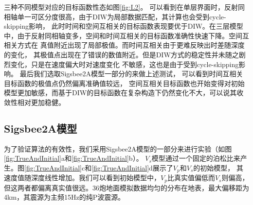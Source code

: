 三种不同模型对应的目标函数性态如图\ref{fig:L2}。
可以看到在单层界面时，反射同相轴单一可区分度很高，由于DIW为局部数据匹配，其计算也会受到cycle-skipping影响，
此时时间和空间互相关的目标函数表现要优于DIW。在三层模型中，由于反射同相轴变多，空间和时间互相关的目标函数准确性快速下降。空间互相关方式在
真值附近出现了局部极值。而时间互相关由于更难反映出时差随深度的变化，
其极值点出现在了错误的数值附近。但是DIW方式的稳定性并未随之剧烈变化，只是在速度偏大时对速度变化
不敏感，这也是由于受到cycle-skipping影响。
最后我们选取Sigsbee2A模型一部分的来做上述测试，
可以看到时间互相关目标函数的极值点仍然偏离准确值较远，
空间互相关目标函数也开始变得对初始模型更加敏感，而基于DIW的目标函数在复杂构造下仍然变化不大，可以说其收敛性相对更加稳健。

\subsection{Sigsbee2A模型}
为了验证算法的有效性，我们采用Sigsbee2A模型的一部分来进行实验（如图\ref{fig:TrueAndInitial}a和\ref{fig:TrueAndInitial}b）。
$V_s$模型通过一个固定的泊松比来产生。图\ref{fig:TrueAndInitial}c和\ref{fig:TrueAndInitial}d展示了$V_p$和$V_s$的初始模型，
其速度值随深度线性增加。我们可以看到初始模型中，$V_p$比真实值偏低而$V_s$则偏高，
但这两者都偏离真实值很远。36炮地面模拟数据均匀的分布在地表，最大偏移距为4km，其震源为主频15Hz的纯P波震源。
